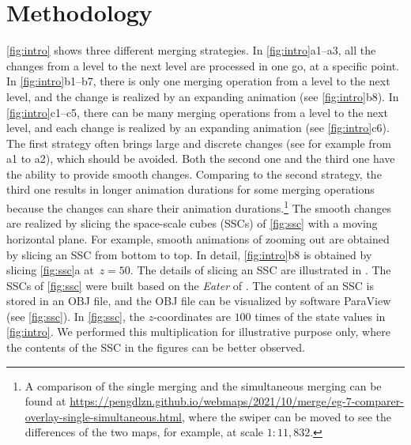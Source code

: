\documentclass[twocolumn]{svjour3}          %
\begin{document}




\section{Methodology}
\label{sec:methodology}

\fig\ref{fig:intro} shows three different merging strategies.
In \figs\ref{fig:intro}a1--a3, all the changes 
from a level to the next level are processed in one go,
at a specific point.
In \figs\ref{fig:intro}b1--b7, 
there is only one merging operation from a level to the next level,
and the change is realized by an expanding animation
(see \fig\ref{fig:intro}b8).
In \figs\ref{fig:intro}c1--c5, 
there can be many merging operations from a level to the next level,
and each change is realized by an expanding animation
(see \fig\ref{fig:intro}c6).
The first strategy often brings large and discrete changes
(see for example from a1 to a2),
which should be avoided.
Both the second one and the third one 
have the ability to provide smooth changes.
Comparing to the second strategy, 
the third one results in longer animation durations
for some merging operations 
because the changes can share their animation durations.\footnote{%
A comparison of the single merging and the simultaneous merging can be found at 
\url{https://pengdlzn.github.io/webmaps/2021/10/merge/eg-7-comparer-overlay-single-simultaneous.html},
where the swiper can be moved to see the differences of the two maps,
for example, at scale $1:11{,}832$.}
The smooth changes are realized 
by slicing the space-scale cubes (SSCs) of \fig\ref{fig:ssc}
with a moving horizontal plane.
For example, smooth animations of zooming out are obtained by
slicing an SSC from bottom to top.
In detail, \fig\ref{fig:intro}b8 is obtained by slicing
\fig\ref{fig:ssc}a at~$z= 50$.
The details of slicing an SSC are illustrated in \citet{Meijers2020Web}.
The SSCs of \fig\ref{fig:ssc} were built 
based on the \emph{Eater} of \citet{Suba2014Merge}.
The content of an SSC is stored in an OBJ file,
and the OBJ file can be visualized by software ParaView
(see \fig\ref{fig:ssc}).
In \fig\ref{fig:ssc}, the $z$-coordinates are $100$ times of
the state values in \fig\ref{fig:intro}.
We performed this multiplication for illustrative purpose only, 
where the contents of the SSC in the figures can be better observed.
\end{document}
